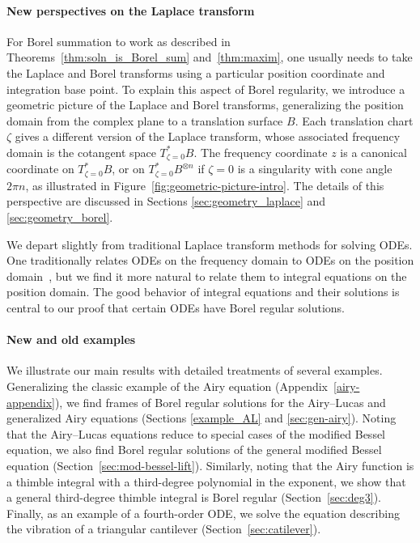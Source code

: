 \documentclass{article}
\theoremstyle{definition}
\theoremstyle{plain}
\begin{document}
\paragraph{New perspectives on the Laplace transform}
%
For Borel summation to work as described in Theorems~\ref{thm:soln_is_Borel_sum} and~\ref{thm:maxim}, one usually needs to take the Laplace and Borel transforms using a particular position coordinate and integration base point. To explain this aspect of Borel regularity, we introduce a geometric picture of the Laplace and Borel transforms, generalizing the position domain from the complex plane to a translation surface $B$. Each translation chart $\zeta$ gives a different version of the Laplace transform, whose associated frequency domain is the cotangent space $T^*_{\zeta = 0} B$. The frequency coordinate $z$ is a canonical coordinate on $T^*_{\zeta = 0}B$, or on $T^*_{\zeta = 0}B^{\otimes n}$ if $\zeta = 0$ is a singularity with cone angle $2\pi n$, as illustrated in Figure~\ref{fig:geometric-picture-intro}. The details of this perspective are discussed in Sections \ref{sec:geometry_laplace} and \ref{sec:geometry_borel}.
\begin{center}
\phaseSpaceLaplace
{}\label{fig:geometric-picture-intro}
\end{center}

We depart slightly from traditional Laplace transform methods for solving ODEs. One traditionally relates ODEs on the frequency domain to ODEs on the position domain~\cite{braaksma2006laplace,laplace-tfm}, but we find it more natural to relate them to integral equations on the position domain. The good behavior of integral equations and their solutions is central to our proof that certain ODEs have Borel regular solutions.
%
\paragraph{New and old examples}
%
We illustrate our main results with detailed treatments of several examples. Generalizing the classic example of the Airy equation (Appendix~\ref{airy-appendix}), we find frames of Borel regular solutions for the Airy--Lucas and generalized Airy equations (Sections \ref{example_AL} and \ref{sec:gen-airy}). Noting that the Airy--Lucas equations reduce to special cases of the modified Bessel equation, we also find Borel regular solutions of the general modified Bessel equation (Section~\ref{sec:mod-bessel-lift}). Similarly, noting that the Airy function is a thimble integral with a third-degree polynomial in the exponent, we show that a general third-degree thimble integral is Borel regular (Section~\ref{sec:deg3}). Finally, as an example of a fourth-order ODE, we solve the equation describing the vibration of a triangular cantilever (Section~\ref{sec:catilever}).
\end{document}
